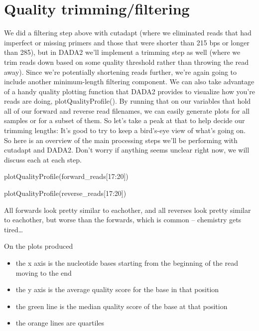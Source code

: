 \documentclass[
]{book}
\newenvironment{Shaded}{\begin{snugshade}}{\end{snugshade}}
\newcommand{\DecValTok}[1]{\textcolor[rgb]{0.00,0.00,0.81}{#1}}
\newcommand{\FunctionTok}[1]{\textcolor[rgb]{0.00,0.00,0.00}{#1}}
\newcommand{\NormalTok}[1]{#1}
\newcommand{\SpecialCharTok}[1]{\textcolor[rgb]{0.00,0.00,0.00}{#1}}
\begin{document}
\hypertarget{quality-trimmingfiltering}{%
\section{Quality trimming/filtering}\label{quality-trimmingfiltering}}

We did a filtering step above with cutadapt (where we eliminated reads that had imperfect or missing primers and those that were shorter than 215 bps or longer than 285), but in DADA2 we'll implement a trimming step as well (where we trim reads down based on some quality threshold rather than throwing the read away). Since we're potentially shortening reads further, we're again going to include another minimum-length filtering component. We can also take advantage of a handy quality plotting function that DADA2 provides to visualize how you're reads are doing, plotQualityProfile(). By running that on our variables that hold all of our forward and reverse read filenames, we can easily generate plots for all samples or for a subset of them. So let's take a peak at that to help decide our trimming lengths: It's good to try to keep a bird's-eye view of what's going on. So here is an overview of the main processing steps we'll be performing with cutadapt and DADA2. Don't worry if anything seems unclear right now, we will discuss each at each step.

\begin{Shaded}
\begin{Highlighting}[]
    \FunctionTok{plotQualityProfile}\NormalTok{(forward\_reads[}\DecValTok{17}\SpecialCharTok{:}\DecValTok{20}\NormalTok{])}

    \FunctionTok{plotQualityProfile}\NormalTok{(reverse\_reads[}\DecValTok{17}\SpecialCharTok{:}\DecValTok{20}\NormalTok{])}
\end{Highlighting}
\end{Shaded}

All forwards look pretty similar to eachother, and all reverses look pretty similar to eachother, but worse than the forwards, which is common -- chemistry gets tired\ldots{}

On the plots produced

\begin{itemize}
\item
  the x axis is the nucleotide bases starting from the beginning of the read moving to the end
\item
  the y axis is the average quality score for the base in that position
\item
  the green line is the median quality score of the base at that position
\item
  the orange lines are quartiles
\end{itemize}
\end{document}
